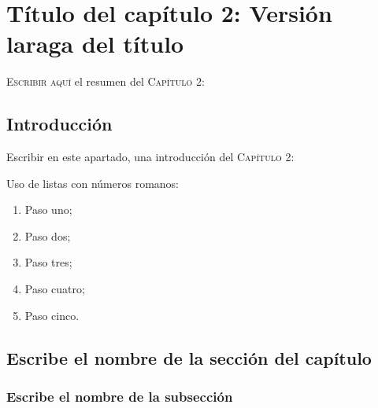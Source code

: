 \chapter{Título del capítulo 2: Versión laraga del título}

\begin{ResumenPhDThesis}
\begin{changemargin}{1cm}{1cm}
\lettrine[lines=3]{E}{scribir aquí} el resumen del \textsc{Capítulo 2}: \lipsum[3]
\end{changemargin}
\end{ResumenPhDThesis}



\section{Introducción}
Escribir en este apartado, una introducción del \textsc{Capítulo 2}: \lipsum[1]

Uso de listas con números romanos: 

\begin{enumerate}[label=\roman*.]
	\item Paso uno;
	\item Paso dos;
	\item Paso tres;
	\item Paso cuatro;
	\item Paso cinco.
\end{enumerate}


\section{Escribe el nombre de la sección del capítulo}
\lipsum[2]

\subsection{Escribe el nombre de la subsección}
\lipsum[2]

